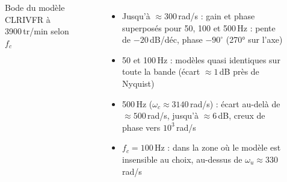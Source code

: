 \begin{frame}

    \begin{columns}[c]
        \begin{figure}
            \centering
            \caption{Bode du modèle CLRIVFR à 3900\,tr/min selon $f_c$}
        \end{figure}

        \begin{itemize}
            \item Jusqu'à $\approx 300$\,rad/s : gain et phase \alert{superposés} pour 50, 100 et 500\,Hz : pente de $-20$\,dB/déc, phase $-90^\circ$ (270° sur l'axe)
            \item 50 et 100\,Hz : modèles quasi identiques sur toute la bande (écart $\approx 1$\,dB près de Nyquist)
            \item 500\,Hz ($\omega_c \approx 3140$\,rad/s) : écart au-delà de $\approx 500$\,rad/s, jusqu'à $\approx 6$\,dB, creux de phase vers $10^3$\,rad/s
            \item $f_c = 100$\,Hz : dans la zone où le modèle est \alert{insensible} au choix, au-dessus de $\omega_u \approx 330$\,rad/s
        \end{itemize}
    \end{columns}
\end{frame}

